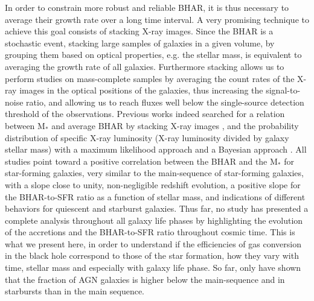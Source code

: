     In order to constrain more robust and reliable BHAR, 
    it is thus necessary to average their growth rate over a long time interval. A very promising technique to achieve this goal consists of stacking X-ray images. Since the BHAR is a stochastic event, stacking large samples of galaxies in a given volume, by grouping them based on optical properties, e.g. the stellar mass,  is equivalent to averaging the growth rate of all galaxies.
    Furthermore stacking allows us to perform studies on mass-complete samples by averaging the count rates of the X-ray images in the optical positions of the galaxies, thus increasing the signal-to-noise ratio, and allowing us to reach fluxes well below the single-source detection threshold of the observations. %
    Previous works indeed searched for a relation between M$_*$ and average BHAR by stacking X-ray images \citep[e.g.,][]{2012ApJ...753L..30M, 2015ApJ...800L..10R, 2017ApJ...842...72Y}, and the probability distribution of specific X-ray luminosity (X-ray luminosity divided by galaxy stellar mass) %
    with a maximum likelihood approach \citep{2012ApJ...746...90A, 2012MNRAS.427.3103B, 2018MNRAS.475.1887Y} and a Bayesian approach \citep{2018MNRAS.474.1225A}. All studies point toward a positive correlation between the BHAR and the M$_*$ for star-forming galaxies, very similar to the main-sequence of star-forming galaxies, with a slope close to unity, non-negligible redshift evolution, a positive slope for the BHAR-to-SFR ratio as a function of stellar mass, and indications of different behaviors for quiescent and starburst galaxies. 
    Thus far, no study has presented a complete analysis throughout all galaxy life phases by highlighting the evolution of the accretions and the BHAR-to-SFR ratio throughout cosmic time. This is what we present here, in order to understand if the efficiencies of gas conversion in the black hole correspond to those of the star formation, how they vary with time, stellar mass and especially with galaxy life phase. %
    So far, only \citet{2019MNRAS.484.4360A} have shown that the fraction of AGN galaxies is higher below the main-sequence and in starbursts than in the main sequence. %
        
